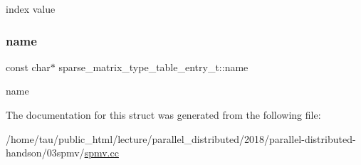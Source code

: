 index value \mbox{\label{structsparse__matrix__type__table__entry__t_a7e2dea3171064e4ffece2e2c8a88c9ce}} 
\subsubsection{\texorpdfstring{name}{name}}
{\footnotesize\ttfamily const char$\ast$ sparse\+\_\+matrix\+\_\+type\+\_\+table\+\_\+entry\+\_\+t\+::name}

name 

The documentation for this struct was generated from the following file\+:\begin{DoxyCompactItemize}
\item 
/home/tau/public\+\_\+html/lecture/parallel\+\_\+distributed/2018/parallel-\/distributed-\/handson/03spmv/\hyperlink{spmv_8cc}{spmv.\+cc}\end{DoxyCompactItemize}

